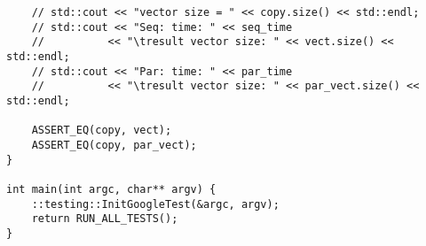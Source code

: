\documentclass{report}
\begin{document}
\begin{lstlisting}
    // std::cout << "vector size = " << copy.size() << std::endl;
    // std::cout << "Seq: time: " << seq_time
    //          << "\tresult vector size: " << vect.size() << std::endl;
    // std::cout << "Par: time: " << par_time
    //          << "\tresult vector size: " << par_vect.size() << std::endl;

    ASSERT_EQ(copy, vect);
    ASSERT_EQ(copy, par_vect);
}

int main(int argc, char** argv) {
    ::testing::InitGoogleTest(&argc, argv);
    return RUN_ALL_TESTS();
}

\end{lstlisting}
\end{document}
